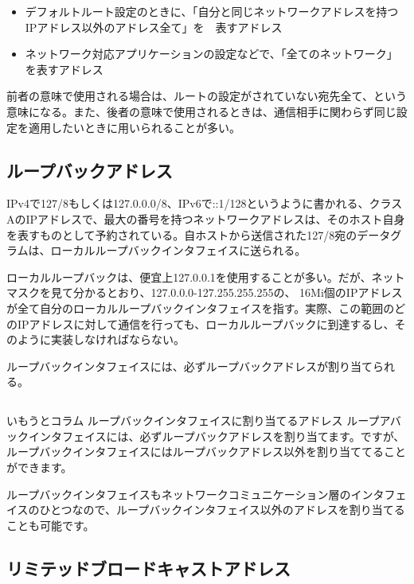 \begin{itemize}
\item デフォルトルート設定のときに、「自分と同じネットワークアドレスを持つIPアドレス以外のアドレス全て」を　表すアドレス
\item ネットワーク対応アプリケーションの設定などで、「全てのネットワーク」を表すアドレス
\end{itemize}

前者の意味で使用される場合は、ルートの設定がされていない宛先全て、という意味になる。また、後者の意味で使用されるときは、通信相手に関わらず同じ設定を適用したいときに用いられることが多い。

\subsection{ループバックアドレス}

IPv4で127/8もしくは127.0.0.0/8、IPv6で::1/128というように書かれる、クラスAのIPアドレスで、最大の番号を持つネットワークアドレスは、そのホスト自身を表すものとして予約されている。自ホストから送信された127/8宛のデータグラムは、ローカルループバックインタフェイスに送られる。

ローカルループバックは、便宜上127.0.0.1を使用することが多い。だが、ネットマスクを見て分かるとおり、127.0.0.0-127.255.255.255の、 16Mi個のIPアドレスが全て自分のローカルループバックインタフェイスを指す。実際、この範囲のどのIPアドレスに対して通信を行っても、ローカルループバックに到達するし、そのように実装しなければならない。

ループバックインタフェイスには、必ずループバックアドレスが割り当てられる。

\subsection*{}
\begin{itembox}[l]{いもうとコラム ループバックインタフェイスに割り当てるアドレス}
ループアバックインタフェイスには、必ずループバックアドレスを割り当てます。ですが、ループバックインタフェイスにはループバックアドレス以外を割り当ててることができます。

ループバックインタフェイスもネットワークコミュニケーション層のインタフェイスのひとつなので、ループバックインタフェイス以外のアドレスを割り当てることも可能です。
\end{itembox}


\subsection{リミテッドブロードキャストアドレス}

